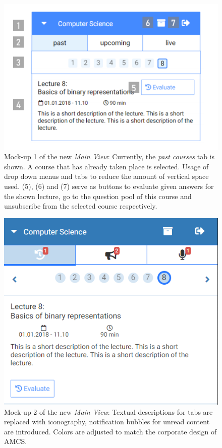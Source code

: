 \begin{figure}[ht]
	\centering
	\begin{minipage}[t]{.7\textwidth}
		\includegraphics[width=\textwidth]{mockups/main_view_enhancement_v1_annotated.png}
			\captionsetup{width=.8\linewidth}
		\caption{Mock-up 1 of the new \emph{Main View}: Currently, the \emph{past courses} tab is shown.
		A course that has already taken place is selected.
		Usage of drop down menus and tabs to reduce the amount of vertical space used. (5), (6) and (7) serve as buttons to evaluate given answers for the shown lecture, go to the question pool of this course and unsubscribe from the selected course respectively.
		}
		\label{figure:mainviewenhancement}
	\end{minipage}%
\end{figure}
\begin{figure}[ht]
	\begin{minipage}[t]{\textwidth}
		\centering
		\includegraphics[width=.7\textwidth]{mockups/main_view_enhancement_v2_cropped.png}
				\captionsetup{width=.8\linewidth}
		\caption{Mock-up 2 of the new \emph{Main View}:
			Textual descriptions for tabs are replaced with iconography, notification
			bubbles for unread content are introduced. Colors are adjusted to match the corporate design of AMCS.
		}
		\label{figure:mainviewenhancement2}
	\end{minipage}
\end{figure}
